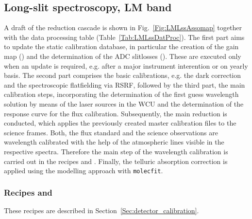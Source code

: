 \clearpage
\subsection{Long-slit spectroscopy, LM band}
\label{ssec:recipes_lss_lm}

A draft of the reduction cascade is shown in
Fig.~\ref{Fig:LMLssAssomap} together with the data processing table
(Table~\ref{Tab:LMLssDatProc}). The first part aims to update the static calibration database, in particular the creation of the gain map (\hyperref[Sec:detector_calibration]{}) and the determination of the \ac{ADC} slitlosses (\hyperref[rec:metislmadcmslitloss]{}). These are executed only when an update is required, e.g. after a major instrument interention or on yearly basis. The second part comprises the basic calibrations, e.g. the dark correction and the spectroscopic flatfielding via \ac{RSRF}, followed by the third part, the main calibration steps, incorporating the determination of the first guess wavelength solution by means of the laser sources in the \ac{WCU} and the determination of the response curve for the flux calibration. Subsequently, the main reduction is conducted, which applies the previously created master calibration files to the science frames. Both, the flux standard and the science observations are wavelength calibrated with the help of the atmospheric lines visible in the respective spectra. Therefore the main step of the wavelength calibration is carried out in the recipes \hyperref[rec:lsslmflux]{} and \hyperref[rec:lsslmsci]{}. Finally, the telluric absorption correction is applied using the modelling approach with \texttt{molecfit}.


\subsubsection{Recipes  and }
These recipes are described in Section~\ref{Sec:detector_calibration}.


